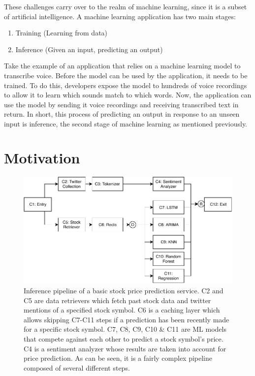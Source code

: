 \documentclass{report}
\begin{document}
These challenges carry over to the realm of machine learning, since it is a subset of artificial intelligence.
A machine learning application has two main stages:
\begin{enumerate}
  \item Training (Learning from data)
  \item Inference (Given an input, predicting an output)
\end{enumerate}

Take the example of an application that relies on a machine learning model to transcribe voice. Before the model can be used by the application, it needs to be trained. To do this, developers expose the model to hundreds of voice recordings to allow it to learn which sounds match to which words. Now, the application can use the model by sending it voice recordings and receiving transcribed text in return. In short, this process of predicting an output in response to an unseen input is inference, the second stage of machine learning as mentioned previously.

\section{Motivation}

\begin{figure}
  \centering
  \includegraphics[width=\textwidth]{StockPriceServiceBasic.pdf}
  \caption{Inference pipeline of a basic stock price prediction service. C2 and C5 are data retrievers which fetch past stock data and twitter mentions of a specified stock symbol. C6 is a caching layer which allows skipping C7-C11 steps if a prediction has been recently made for a specific stock symbol. C7, C8, C9, C10 \& C11 are ML models that compete against each other to predict a stock symbol's price. C4 is a sentiment analyzer whose results are taken into account for price prediction. As can be seen, it is a fairly complex pipeline composed of several different steps.}
  \label{fig:StockPriceServiceBasic}
\end{figure}
\end{document}
